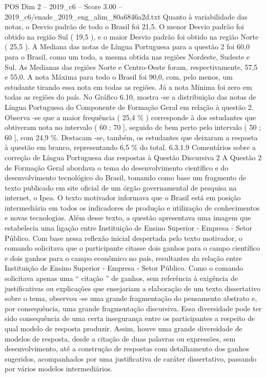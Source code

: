 \begin{textsample}{POS Dim 2 – 2019\_c6 – Score 3.00 – 2019\_c6/enade\_2019\_eng\_alim\_80a6846a2d.txt}
Quanto à variabilidade das notas, o Desvio padrão de todo o Brasil foi 21,5.
O menor Desvio padrão foi obtido na região Sul ( 19,5 ), e o maior Desvio padrão foi obtido na região Norte ( 25,5 ).
A Mediana das notas de Língua Portuguesa para a questão 2 foi 60,0 para o Brasil, como um todo, a mesma obtida nas regiões Nordeste, Sudeste e Sul.
As Medianas das regiões Norte e Centro-Oeste foram, respectivamente, 57,5 e 55,0.
A nota Máxima para todo o Brasil foi 90,0, com, pelo menos, um estudante tirando essa nota em todas as regiões.
Já a nota Mínima foi zero em todas as regiões do país.
No Gráfico 6.10, mostra -se a distribuição das notas de Língua Portuguesa do Componente de Formação Geral em relação à questão 2.
Observa -se que a maior frequência ( 25,4 \% ) corresponde à dos estudantes que obtiveram nota no intervalo ( 60 ; 70 ], seguido de bem perto pelo intervalo ( 50 ; 60 ], com 24,9 \%.
Destacam -se, também, os estudantes que deixaram a resposta à questão em branco, representando 6,5 \% do total. 6.3.1.9 Comentários sobre a correção de Língua Portuguesa das respostas à Questão Discursiva 2 A Questão 2 de Formação Geral abordava o tema do desenvolvimento científico e do desenvolvimento tecnológico do Brasil, tomando como base um fragmento de texto publicado em site oficial de um órgão governamental de pesquisa na internet, o Ipea.
O texto motivador informava que o Brasil está em posição intermediária em todos os indicadores de produção e utilização de conhecimentos e novas tecnologias.
Além desse texto, a questão apresentava uma imagem que estabelecia uma ligação entre Instituição de Ensino Superior - Empresa - Setor Público.
Com base nessa reflexão inicial despertada pelo texto motivador, o comando solicitava que o participante citasse dois ganhos para o campo científico e dois ganhos para o campo econômico no país, resultantes da relação entre Instituição de Ensino Superior - Empresa - Setor Público.
Como o comando solicitava apenas uma “ citação ” de ganhos, sem referência à exigência de justificativas ou explicações que ensejariam a elaboração de um texto dissertativo sobre o tema, observou -se uma grande fragmentação do pensamento abstrato e, por consequência, uma grande fragmentação discursiva.
Essa diversidade pode ter sido consequência de uma certa insegurança entre os participantes a respeito de qual modelo de resposta produzir.
Assim, houve uma grande diversidade de modelos de resposta, desde a citação de duas palavras ou expressões, sem desenvolvimento, até a construção de respostas com detalhamento dos ganhos sugeridos, acompanhados por uma justificativa de caráter dissertativo, passando por vários modelos intermediários.

\end{textsample}
